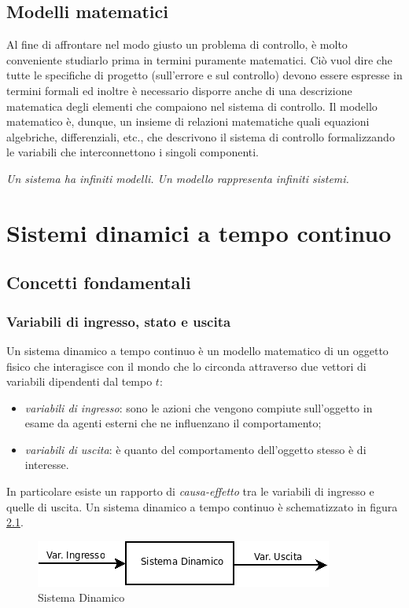 \documentclass[a4paper]{report}
\begin{document}
\section{Modelli matematici}
Al fine di affrontare nel modo giusto un problema di controllo, \`e
molto conveniente studiarlo prima in termini puramente
matematici. Ci\`o vuol dire che tutte le specifiche di
progetto (sull'errore e sul controllo) devono essere espresse in
termini formali ed inoltre \`e necessario disporre anche di una
descrizione matematica degli elementi che compaiono nel sistema di
controllo. Il modello matematico \`e, dunque, un insieme di relazioni matematiche
quali equazioni algebriche, differenziali, etc., che descrivono il
sistema di controllo formalizzando le variabili che interconnettono i
singoli componenti. 

{\em Un sistema ha infiniti modelli. Un modello rappresenta infiniti
  sistemi.}

\chapter{Sistemi dinamici a tempo continuo}
\section{Concetti fondamentali}
\subsection{Variabili di ingresso, stato e uscita}
Un sistema dinamico a tempo continuo \`e un modello
matematico di un oggetto fisico che interagisce con il mondo che lo
circonda attraverso due vettori di variabili dipendenti dal tempo $t$: 
\begin{itemize}
\item{\emph{variabili di ingresso}}: sono le azioni che vengono
  compiute sull'oggetto in esame da agenti esterni che ne influenzano
  il comportamento;
\item{\emph{variabili di uscita}}: \`e quanto del comportamento
  dell'oggetto stesso \`e di interesse. 
\end{itemize}
In particolare esiste un rapporto di \emph{causa-effetto} tra le
variabili di ingresso e quelle di uscita. Un sistema dinamico a tempo
continuo \`e schematizzato in figura \ref{fig:fig3}.
\begin{figure}[!h]
  \begin{center}
    \includegraphics[scale=0.5]{./figures/dynasys.png}
    \caption{Sistema Dinamico}\label{fig:fig3}
  \end{center}
\end{figure}  
\end{document}
